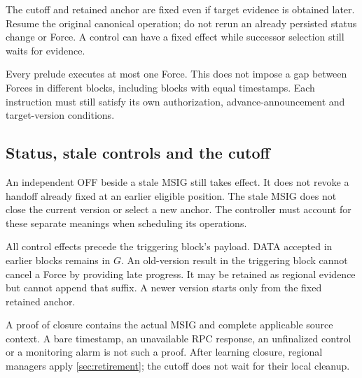 The cutoff and retained anchor are fixed even if target evidence is
obtained later. Resume the original canonical operation; do not rerun
an already persisted status change or Force. A control can have a fixed
effect while successor selection still waits for evidence.

Every prelude executes at most one Force. This does not impose a gap
between Forces in different blocks, including blocks with equal
timestamps. Each instruction must still satisfy its own authorization,
advance-announcement and target-version conditions.

\subsection{Status, stale controls and the cutoff}
An independent OFF beside a stale MSIG still takes effect. It does not
revoke a handoff already fixed at an earlier eligible position.
The stale MSIG does not close the current version or select a new anchor.
The controller must account for these separate meanings when scheduling
its operations.

All control effects precede the triggering block's payload. DATA
accepted in earlier blocks remains in $G$. An old-version result in the
triggering block cannot cancel a Force by providing late progress.
It may be retained as regional evidence but cannot append that suffix.
A newer version starts only from the fixed retained anchor.

A proof of closure contains the actual MSIG and complete applicable
source context. A bare timestamp, an unavailable RPC response, an
unfinalized control or a monitoring alarm is not such a proof.
After learning closure, regional managers apply \cref{sec:retirement};
the cutoff does not wait for their local cleanup.
